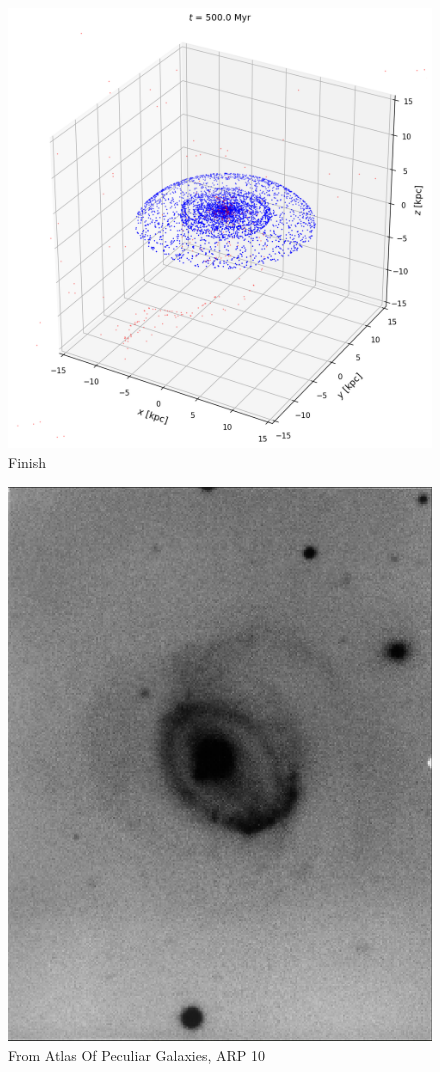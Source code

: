 \documentclass[linenumbers,RNAAS,trackchanges]{aastex631}
\begin{document}
\begin{figure}[H]
    \centering
    \includegraphics[scale=.40]{comparison_galaxy/ARP_10_output.png}
    \caption{Finish}
    \label{fig:code}
\end{figure}
\begin{figure}[H]
    \centering
    \includegraphics[scale=.50]{comparison_galaxy/arp_10.png}
    \caption{From Atlas Of Peculiar Galaxies, ARP 10}
    \label{fig:code}
\end{figure}
\end{document}
